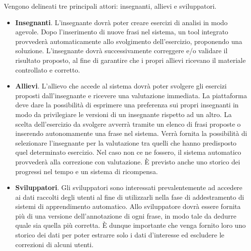 Vengono delineati tre principali attori: insegnanti, allievi e sviluppatori.
\begin{itemize}
	\item \textbf{Insegnanti}. L'insegnante dovrà poter creare esercizi
	 di analisi in modo agevole. Dopo l'inserimento di nuove frasi
	 nel sistema, un tool integrato provvederà automaticamente allo svolgimento
	 dell'esercizio, proponendo una soluzione. L'insegnante dovrà 
	 successivamente correggere e/o validare il risultato proposto, al fine di
	 garantire che i propri allievi ricevano il materiale controllato e corretto.
	\item \textbf{Allievi}.
	L'allievo che accede al sistema dovrà poter svolgere gli esercizi proposti
	dall'insegnante e ricevere una valutazione immediata. La piattaforma
	deve dare la possibilità di esprimere una preferenza sui propri insegnanti in modo da
	privilegiare le versioni di un insegnante rispetto ad un altro. La scelta
	dell'esercizio da svolgere avverrà tramite un elenco di frasi proposte o
	inserendo autonomamente una frase nel sistema. Verrà fornita la possibilità
	di selezionare l'insegnante per la valutazione tra quelli che hanno
	predisposto quel determinato esercizio. Nel caso non ce ne fossero, il
	sistema automatico provvederà alla correzione con valutazione. \`E previsto
    anche uno storico dei progressi nel tempo e un sistema di ricompensa.
	\item \textbf{Sviluppatori}.
	Gli sviluppatori sono interessati prevalentemente ad accedere ai dati
	raccolti degli utenti al fine di utilizzarli nella fase di addestramento di
	sistemi di apprendimento automatico. Allo sviluppatore dovrà essere fornita
	più di una versione dell'annotazione di ogni frase, in modo tale da dedurre
	quale sia quella più corretta. \`E dunque importante che venga fornito loro
	uno storico dei dati per poter estrarre solo i dati d'interesse ed
	escludere le correzioni di alcuni utenti. 
\end{itemize}
